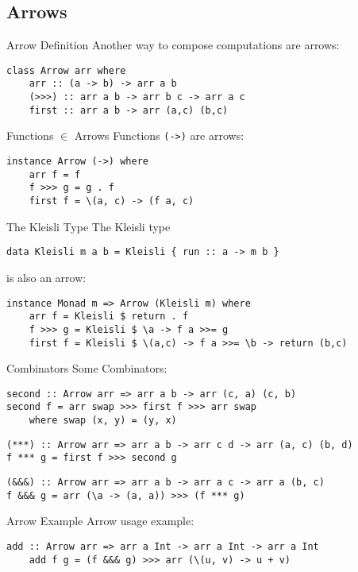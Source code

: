 \subsection{Arrows}
\begin{frame}[fragile]{Arrow Definition}
Another way to compose computations are arrows:
\begin{lstlisting}[frame=htrbl]
class Arrow arr where
	arr :: (a -> b) -> arr a b
	(>>>) :: arr a b -> arr b c -> arr a c
	first :: arr a b -> arr (a,c) (b,c)
\end{lstlisting}
\end{frame}

\begin{frame}[fragile]{Functions $\in$ Arrows}
Functions \lstinline{(->)} are arrows:
\begin{lstlisting}[frame=htrbl]
instance Arrow (->) where
	arr f = f
	f >>> g = g . f
	first f = \(a, c) -> (f a, c)
\end{lstlisting}
\end{frame}

\begin{frame}[fragile]{The Kleisli Type}
The Kleisli type
\begin{lstlisting}[frame=htrbl]
data Kleisli m a b = Kleisli { run :: a -> m b }
\end{lstlisting}
is also an arrow:
\begin{lstlisting}[frame=htrbl]
instance Monad m => Arrow (Kleisli m) where
	arr f = Kleisli $ return . f
	f >>> g = Kleisli $ \a -> f a >>= g
	first f = Kleisli $ \(a,c) -> f a >>= \b -> return (b,c)
\end{lstlisting}
\end{frame}

\begin{frame}[fragile]{Combinators}
Some Combinators:
\begin{lstlisting}[frame=htrbl]
second :: Arrow arr => arr a b -> arr (c, a) (c, b)
second f = arr swap >>> first f >>> arr swap
	where swap (x, y) = (y, x)
\end{lstlisting}
\begin{lstlisting}[frame=htrbl]
(***) :: Arrow arr => arr a b -> arr c d -> arr (a, c) (b, d)
f *** g = first f >>> second g
\end{lstlisting}
\begin{lstlisting}[frame=htrbl]
(&&&) :: Arrow arr => arr a b -> arr a c -> arr a (b, c)
f &&& g = arr (\a -> (a, a)) >>> (f *** g)
\end{lstlisting}
\end{frame}

\begin{frame}[fragile]{Arrow Example}
	Arrow usage example:
	\begin{lstlisting}[frame=htrbl]
	add :: Arrow arr => arr a Int -> arr a Int -> arr a Int
	add f g = (f &&& g) >>> arr (\(u, v) -> u + v)
	\end{lstlisting}
\end{frame}